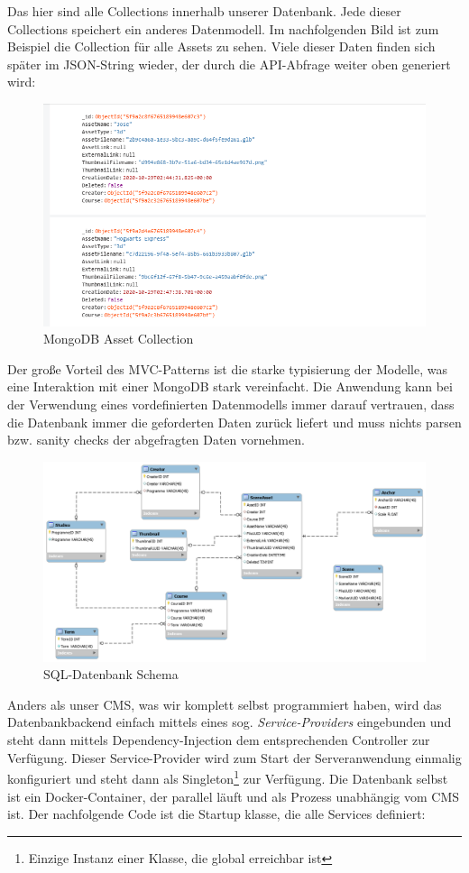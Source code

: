 \documentclass[titlepage, a4paper, 11pt]{scrartcl}
\begin{document}
        Das hier sind alle Collections innerhalb unserer Datenbank. Jede dieser Collections speichert ein anderes Datenmodell. Im nachfolgenden Bild ist zum Beispiel die Collection für alle Assets zu sehen.
        Viele dieser Daten finden sich später im JSON-String wieder, der durch die API-Abfrage weiter oben generiert wird:

        \begin{figure}[h]
          \centering
          \includegraphics[width=.6\textwidth]{MongoAssets.PNG}
          \caption{MongoDB Asset Collection}
          \label{MongoAssets}
        \end{figure}

        Der große Vorteil des MVC-Patterns ist die starke typisierung der Modelle, was eine Interaktion mit einer MongoDB stark vereinfacht.
        Die Anwendung kann bei der Verwendung eines vordefinierten Datenmodells immer darauf vertrauen, dass die Datenbank immer die geforderten Daten zurück liefert 
        und muss nichts parsen bzw. sanity checks der abgefragten Daten vornehmen.

        \begin{figure}[h]
          \centering
          \includegraphics[width=.6\textwidth]{DB_scheme.png}
          \caption{SQL-Datenbank Schema}
          \label{SQLScheme}
        \end{figure}
        
        Anders als unser CMS, was wir komplett selbst programmiert haben, wird das Datenbankbackend einfach mittels eines sog. \textit{Service-Providers} eingebunden
        und steht dann mittels Dependency-Injection dem entsprechenden Controller zur Verfügung. Dieser Service-Provider wird zum Start der Serveranwendung einmalig 
        konfiguriert und steht dann als Singleton\footnote{Einzige Instanz einer Klasse, die global erreichbar ist} zur Verfügung. Die Datenbank selbst ist ein Docker-Container,
        der parallel läuft und als Prozess unabhängig vom CMS ist. Der nachfolgende Code ist die Startup klasse, die alle Services definiert:
\end{document}
